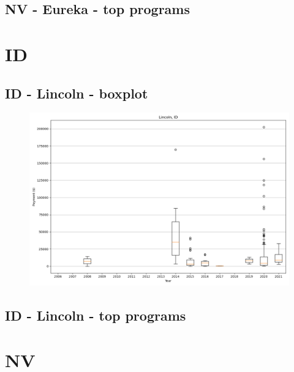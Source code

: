 \subsection*{NV - Eureka - top programs}

\newpage
\section*{ID}
\subsection*{ID - Lincoln - boxplot}
\begin{figure}[h]
\centering
\includegraphics[width=7in]{../output/boxplots/counties/Lincoln-ID_boxplot.png}
\end{figure}


\subsection*{ID - Lincoln - top programs}

\newpage
\section*{NV}
